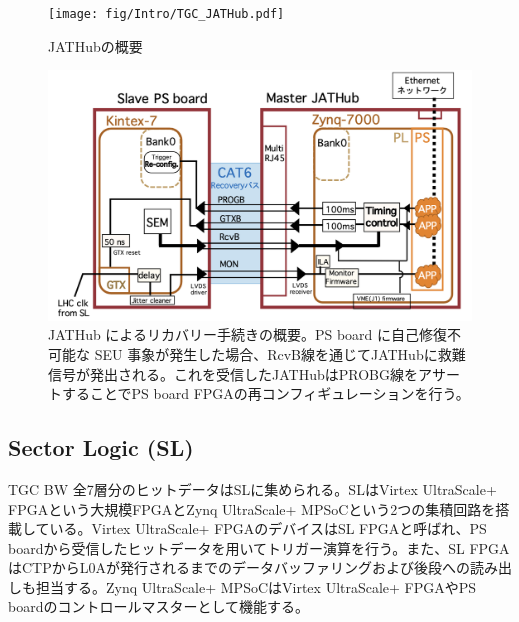     \begin{figure} 
        \centering
        \texttt{[image: fig/Intro/TGC\_JATHub.pdf]}
        \caption[JATHubの概要]{JATHubの概要}
        \label{TGC_JATHub}
    \end{figure}

    \begin{figure} 
    \centering
    \includegraphics[width=16cm]{fig/QAQC/JATHubsem.png}
    \caption[JATHub によるリカバリー手続きの概要]{JATHub によるリカバリー手続きの概要\cite{mt_atanaka}。PS board に自己修復不可能な SEU 事象が発生した場合、RcvB線を通じてJATHubに救難信号が発出される。これを受信したJATHubはPROBG線をアサートすることでPS board FPGAの再コンフィギュレーションを行う。}
    \label{JATHubsem}
    \end{figure}

        \subsection*{Sector Logic  (SL) }
TGC BW 全7層分のヒットデータはSLに集められる。SLはVirtex UltraScale+ FPGAという大規模FPGAとZynq UltraScale+ MPSoCという2つの集積回路を搭載している。Virtex UltraScale+ FPGAのデバイスはSL FPGAと呼ばれ、PS boardから受信したヒットデータを用いてトリガー演算を行う。また、SL FPGAはCTPからL0Aが発行されるまでのデータバッファリングおよび後段への読み出しも担当する。Zynq UltraScale+ MPSoCはVirtex UltraScale+ FPGAやPS boardのコントロールマスターとして機能する。

